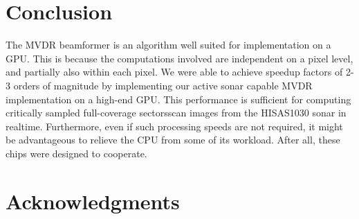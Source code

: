 \documentclass[12pt,journal,captionsoff,onecolumn]{IEEEtran}
\newcommand\1{\vec 1}
\begin{document}
\section{Conclusion}

The \gls{MVDR} beamformer is an algorithm well suited for implementation on a \gls{GPU}. This is because the computations involved are independent on a pixel level, and partially also within each pixel. We were able to achieve speedup factors of 2-3 orders of magnitude by implementing our active sonar capable \gls{MVDR} implementation on a high-end \gls{GPU}. This performance is sufficient for computing critically sampled full-coverage sectorsscan images from the HISAS1030 sonar in realtime. Furthermore, even if such processing speeds are not required, it might be advantageous to relieve the \gls{CPU} from some of its workload. After all, these chips were designed to cooperate.








\section*{Acknowledgments}
\end{document}
